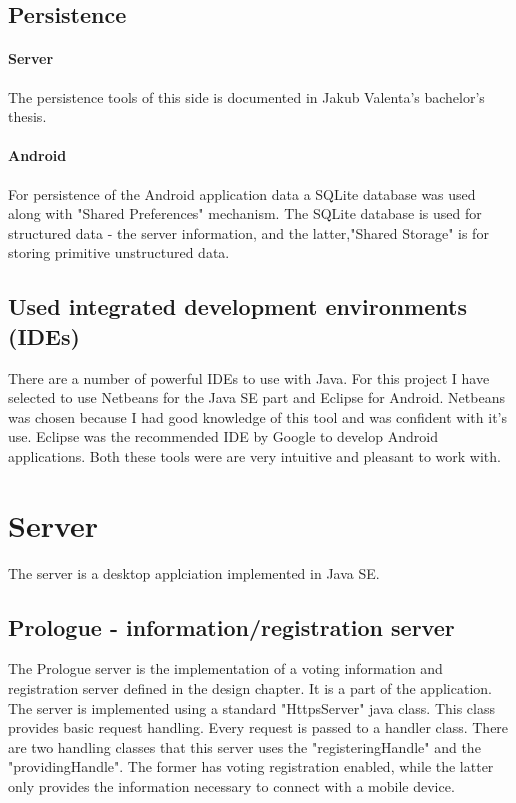 \documentclass[11pt,twoside,a4paper]{book}
\begin{document}
\subsection{Persistence}
\paragraph{Server} The persistence tools of this side is documented in Jakub Valenta's bachelor's thesis\cite{bakalarkaJV}.
\paragraph{Android}
For persistence of the Android application data a SQLite\cite{sqlite} database was used along with "Shared Preferences"\cite{storage} mechanism. The SQLite database is used for structured data - the server information, and the latter,"Shared Storage" is for storing primitive unstructured data.

\subsection{Used integrated development environments (IDEs)}
There are a number of powerful IDEs to use with Java. For this project I have selected to use Netbeans for the Java SE part and Eclipse for Android. Netbeans was chosen because I had good knowledge of this tool and was confident with it's use. Eclipse was the recommended IDE by Google to develop Android applications. Both these tools were are very intuitive and pleasant to work with. 

\section{Server}
The server is a desktop applciation implemented in Java SE.
\subsection{Prologue - information/registration server}
The Prologue server is the implementation of a voting information and registration server defined in the design chapter. It is a part of the application. The server is implemented using a standard "HttpsServer" java class. This class provides basic request handling. Every request is passed to a handler class. There are two handling classes that this server uses the "registeringHandle" and the "providingHandle". The former has voting registration enabled, while the latter only provides the information necessary to connect with a mobile device.
\end{document}
